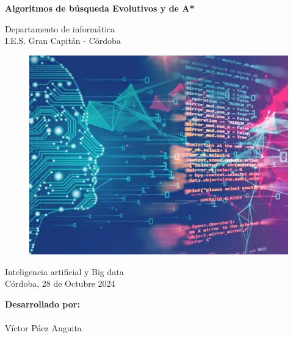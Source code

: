 \documentclass[12pt]{article}
\begin{document}
\begin{titlepage}
    \begin{center}
      \Large \bfseries{}
    \end{center}
    \vspace{0.1cm}
    \begin{center}
      \Large \bfseries{}
    \end{center}
    \vspace{0.1cm}
    \begin{center}
     \Large \bfseries{Algoritmos de búsqueda Evolutivos y de A*}
    \end{center}
    \vspace{0.0001cm}
    \begin{center}
        Departamento de informática \\ I.E.S. Gran Capitán - Córdoba
    \end{center}
        \vspace{2 cm}
\begin{figure}[h!]
    \centering
    \includegraphics[width=.6\textwidth]{Portada.jpg}
    \label{fig:my_label}
\end{figure}
    \vspace{0.2 cm}
    \begin{center}
        Inteligencia artificial y Big data \\ Córdoba, 28 de Octubre 2024
    \end{center}
    \vspace{4 cm}
\null\hfill \textbf{Desarrollado por:}
\\
\\
\null\hfill Víctor Páez Anguita
\clearpage
\end{titlepage}

\tableofcontents
\clearpage
\end{document}
